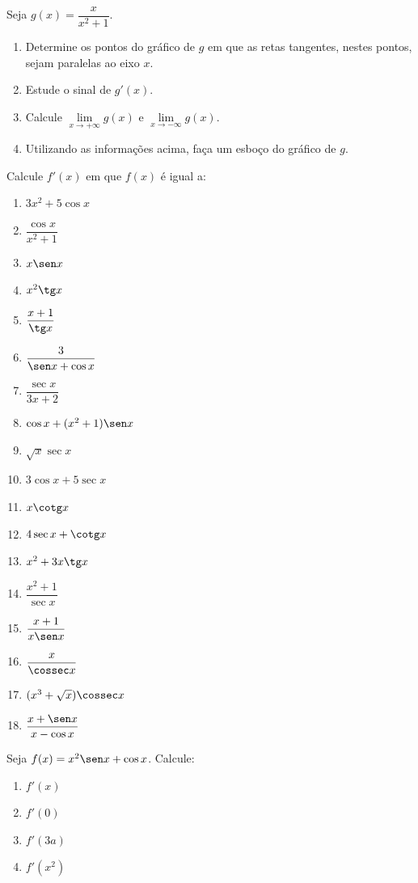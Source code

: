 \begin{exercicio}[8]
Seja $g(x) = \dfrac{x}{x^2 + 1}$.
\begin{enumerate}[label=\alph*)]
    \item Determine os pontos do gráfico de $g$ em que as retas tangentes, nestes pontos, sejam paralelas ao eixo $x$.
    \item Estude o sinal de $g'(x)$.
    \item Calcule $\lim\limits_{x \to +\infty} g(x)$ e $\lim\limits_{x \to -\infty} g(x)$.
    \item Utilizando as informações acima, faça um esboço do gráfico de $g$.
\end{enumerate}
\end{exercicio}

\begin{exercicio}[9]
Calcule $f'(x)$ em que $f(x)$ é igual a:
\begin{enumerate}[label=\alph*)]
    \item $3x^2 + 5\cos x$
    \item $\dfrac{\cos x}{x^2 + 1}$
    \item $x\sen x$
    \item $x^2 \tg x$
    \item $\dfrac{x + 1}{\tg x}$
    \item $\dfrac{3}{\sen x + \cos x}$
    \item $\dfrac{\sec x}{3x + 2}$
    \item $\cos x + (x^2 + 1)\sen x$
    \item $\sqrt{x}\sec x$
    \item $3\cos x + 5\sec x$
    \item $x\cotg x$
    \item $4\sec x + \cotg x$
    \item $x^2 + 3x\tg x$
    \item $\dfrac{x^2 + 1}{\sec x}$
    \item $\dfrac{x + 1}{x\sen x}$
    \item $\dfrac{x}{\cossec x}$
    \item $(x^3 + \sqrt{x})\cossec x$
    \item $\dfrac{x + \sen x}{x - \cos x}$
\end{enumerate}
\end{exercicio}

\begin{exercicio}[10]
Seja $f(x) = x^2 \sen x + \cos x$. Calcule:
\begin{enumerate}[label=\alph*)]
    \item $f'(x)$
    \item $f'(0)$
    \item $f'(3a)$
    \item $f'(x^2)$
\end{enumerate}
\end{exercicio}

